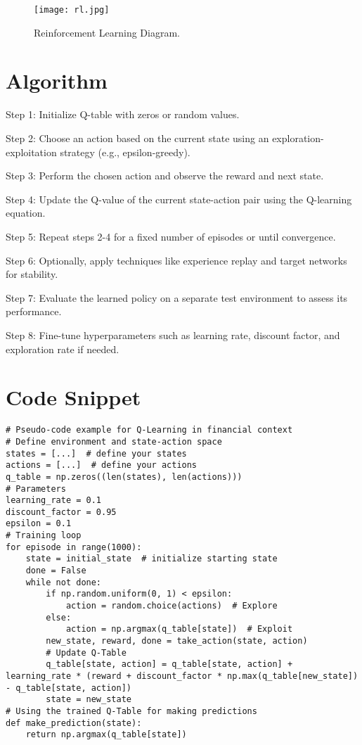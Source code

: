 \documentclass[12pt,a4paper]{report}
\begin{document}
\begin{figure}[ht]
  \centering
 \texttt{[image: rl.jpg]}
  \caption{Reinforcement Learning Diagram.}
\end{figure}


\section{Algorithm}
Step 1: Initialize Q-table with zeros or random values.\par
Step 2: Choose an action based on the current state using an exploration-exploitation strategy (e.g., epsilon-greedy).\par
Step 3: Perform the chosen action and observe the reward and next state.\par
 Step 4: Update the Q-value of the current state-action pair using the Q-learning equation.\par
  Step 5: Repeat steps 2-4 for a fixed number of episodes or until convergence.\par
   Step 6: Optionally, apply techniques like experience replay and target networks for stability.\par
   Step 7: Evaluate the learned policy on a separate test environment to assess its performance.\par
 Step 8: Fine-tune hyperparameters such as learning rate, discount factor, and exploration rate if needed.\par

\section{Code Snippet}
\begin{lstlisting}
# Pseudo-code example for Q-Learning in financial context
# Define environment and state-action space
states = [...]  # define your states
actions = [...]  # define your actions
q_table = np.zeros((len(states), len(actions)))
# Parameters
learning_rate = 0.1
discount_factor = 0.95
epsilon = 0.1
# Training loop
for episode in range(1000):
    state = initial_state  # initialize starting state
    done = False    
    while not done:
        if np.random.uniform(0, 1) < epsilon:
            action = random.choice(actions)  # Explore
        else:
            action = np.argmax(q_table[state])  # Exploit
        new_state, reward, done = take_action(state, action)
        # Update Q-Table
        q_table[state, action] = q_table[state, action] + learning_rate * (reward + discount_factor * np.max(q_table[new_state]) - q_table[state, action])
        state = new_state
# Using the trained Q-Table for making predictions
def make_prediction(state):
    return np.argmax(q_table[state])
\end{lstlisting}
\clearpage
\end{document}
